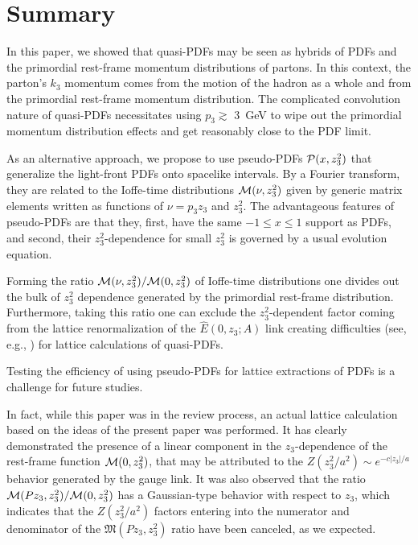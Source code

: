 \section{Summary}

In this paper, we showed that quasi-PDFs may be seen as hybrids of PDFs and the
primordial rest-frame
momentum distributions of partons.
In this context, the parton's $k_3$ momentum
comes from the motion
of the hadron as a whole and from the primordial
rest-frame
momentum distribution. The complicated convolution nature of quasi-PDFs
necessitates using $p_3 \gtrsim $ \mbox{3 GeV} to wipe out
the primordial momentum distribution effects and
get reasonably close to the PDF limit.

As an alternative approach, we propose to use
pseudo-PDFs ${\cal P} (x, z_3^2)  $ that generalize
the light-front PDFs onto spacelike intervals. By a Fourier transform,
they are related to the
Ioffe-time distributions ${\cal M} (\nu, z_3^2) $ given by generic matrix elements
written as functions of $\nu = p_3 z_3$ and $z_3^2$.
The advantageous features of pseudo-PDFs are that they, first, have the
same $-1 \leq x \leq 1$ support as PDFs, and second, their
$z_3^2$-dependence for small $z_3^2$ is governed by a usual evolution equation.

Forming the ratio ${\cal M} (\nu, z_3^2)/{\cal M} (0, z_3^2)$
of Ioffe-time distributions one
divides out the bulk of $z_3^2$ dependence generated by
the primordial rest-frame distribution.
Furthermore, taking this ratio
one can exclude the \mbox{$z_3^2$-dependent} factor coming from the
lattice renormalization of the $\hat E (0,z_3;A)$ link
creating difficulties (see, e.g., \cite{Ishikawa:2016znu}) for lattice calculations of quasi-PDFs.

Testing the efficiency of using pseudo-PDFs for lattice extractions
of PDFs is a challenge for future studies.

In fact, while this paper was in the review
process, an actual lattice calculation \cite{Orginos:2017kos} based on the ideas of
the present paper was performed.
It has clearly demonstrated the presence of a linear component in the $z_3$-dependence
of the rest-frame function ${\cal M} (0,z_3^2)$, that may be attributed
to the $Z(z_3^2/a^2) \sim e^{-c|z_3|/a}$ behavior
generated by the gauge link. It was also observed that
the ratio ${\cal M} (Pz_3 , z_3^2)/{\cal M} (0, z_3^2)$
has a Gaussian-type behavior with respect to $z_3$, which indicates that
the $Z(z_3^2/a^2)$ factors entering into the numerator and denominator
of the ${\mathfrak M} (Pz_3, z_3^2)$ ratio have been canceled, as we expected.

